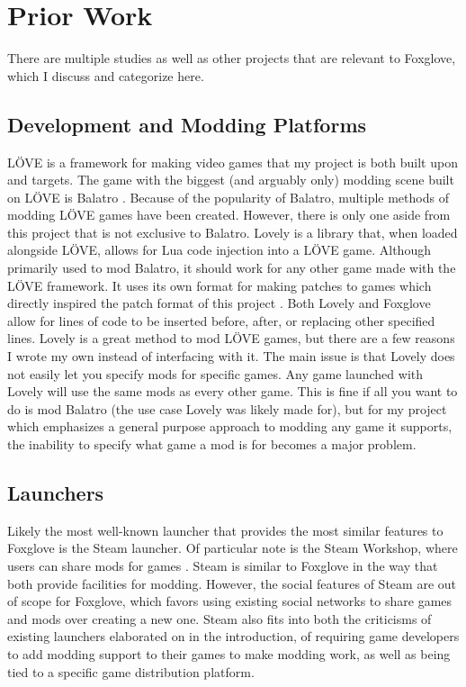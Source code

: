 \documentclass[10pt,twocolumn]{article}
\begin{document}
\section{Prior Work}

There are multiple studies as well as other projects that are relevant to
Foxglove, which I discuss and categorize here.

\subsection{Development and Modding Platforms}

LÖVE is a framework for making video games \cite{noauthor_love_nodate}
that my project is both built upon and targets. The game with the biggest
(and arguably only) modding scene built on LÖVE is Balatro
\cite{noauthor_balatro_2025}. Because of the popularity of Balatro, multiple
methods of modding LÖVE games have been created. However, there is only one
aside from this project that is not exclusive to Balatro.
Lovely is a library that, when loaded alongside LÖVE,
allows for Lua code injection into a
LÖVE game. 
Although primarily used to mod Balatro, it should work for any other game made
with the LÖVE framework.
It uses its own format for making patches to games which directly
inspired the patch format of this project
\cite{green_ethangreen-devlovely-injector_2025}.
Both Lovely and Foxglove allow for
lines of code to be inserted before, after, or replacing other specified lines.
Lovely is a great method to mod LÖVE games, but there are a few reasons I wrote
my own instead of interfacing with it. The main issue is that Lovely does not
easily let you specify mods for specific games. Any game launched with Lovely
will use the same mods as every other game. This is fine if all you want to do
is mod Balatro (the use case Lovely was likely made for), but for my project
which emphasizes a general purpose approach to modding any game it supports,
the inability to specify what game a mod is for becomes a major problem.

\subsection{Launchers}

Likely the most well-known launcher that provides the most similar features to
Foxglove is the Steam launcher. Of particular note is the Steam Workshop,
where users can share mods for games \cite{noauthor_steam_nodate}.
Steam is similar to Foxglove in the way
that both provide facilities for modding. However, the social features of Steam
are out of scope for Foxglove, which favors using existing social
networks to share games and mods over creating a new one. Steam also fits into
both the criticisms of existing launchers elaborated on in the introduction,
of requiring game developers to add modding support to their games to make
modding work, as well as being tied to a specific game distribution platform.
\end{document}
